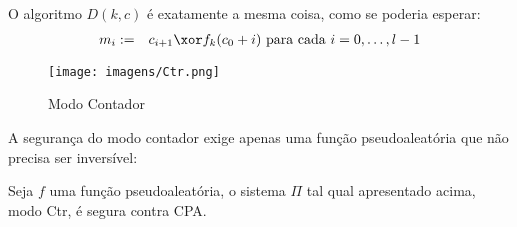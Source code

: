O algoritmo $D(k,c)$ é exatamente a mesma coisa, como se poderia esperar:
\begin{eqnarray*}
  m_i & := & c_{i+1} \xor f_k(c_0 + i) \textrm{ para cada } i = 0, \dots, l-1
\end{eqnarray*} 

\begin{figure}[!htp]
  \centering
  \texttt{[image: imagens/Ctr.png]}
  \caption{Modo Contador}
\end{figure}

A segurança do modo contador exige apenas uma função pseudoaleatória que não precisa ser inversível:


\begin{theorem}
  Seja $f$ uma função pseudoaleatória, o sistema $\Pi$ tal qual apresentado acima, modo Ctr, é segura contra CPA.
\end{theorem}
